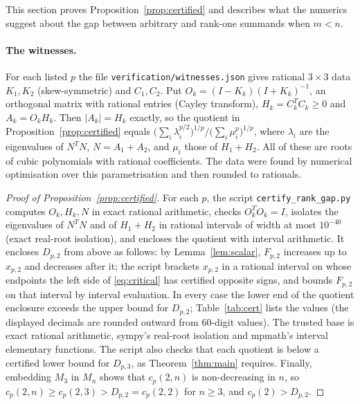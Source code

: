 \documentclass[11pt,a4paper]{article}
\numberwithin{equation}{section}
\theoremstyle{definition}
\theoremstyle{remark}
\begin{document}
This section proves Proposition~\ref{prop:certified} and describes what
the numerics suggest about the gap between arbitrary and rank-one
summands when \(m<n\).

\paragraph{The witnesses.}
For each listed \(p\) the file \texttt{verification/witnesses.json} gives
rational \(3\times3\) data \(K_1,K_2\) (skew-symmetric) and \(C_1,C_2\).
Put \(O_k=(I-K_k)(I+K_k)^{-1}\), an orthogonal matrix with rational entries
(Cayley transform), \(H_k=C_k^TC_k\ge0\) and \(A_k=O_kH_k\). Then
\(|A_k|=H_k\) exactly, so the quotient in Proposition~\ref{prop:certified}
equals \(\bigl(\sum_i\lambda_i^{p/2}\bigr)^{1/p}/
\bigl(\sum_i\mu_i^p\bigr)^{1/p}\), where \(\lambda_i\) are the eigenvalues
of \(N^TN\), \(N=A_1+A_2\), and \(\mu_i\) those of \(H_1+H_2\). All of
these are roots of cubic polynomials with rational coefficients. The data
were found by numerical optimisation over this parametrisation and then
rounded to rationals.

\begin{proof}[Proof of Proposition~\ref{prop:certified}]
For each \(p\), the script \texttt{certify\_rank\_gap.py} computes
\(O_k,H_k,N\) in exact rational arithmetic, checks \(O_k^TO_k=I\),
isolates the eigenvalues of \(N^TN\) and of \(H_1+H_2\) in rational
intervals of width at most \(10^{-40}\) (exact real-root isolation), and
encloses the quotient with interval arithmetic. It encloses \(D_{p,2}\)
from above as follows: by Lemma~\ref{lem:scalar}, \(F_{p,2}\) increases up
to \(x_{p,2}\) and decreases after it; the script brackets \(x_{p,2}\) in a
rational interval on whose endpoints the left side of \eqref{eq:critical}
has certified opposite signs, and bounds \(F_{p,2}\) on that interval by
interval evaluation. In every case the lower end of the quotient
enclosure exceeds the upper bound for \(D_{p,2}\); Table~\ref{tab:cert}
lists the values (the displayed decimals are rounded outward from
60-digit values). The trusted base is exact rational arithmetic, sympy's
real-root isolation and mpmath's interval elementary functions. The script also checks that each quotient is below a
certified lower bound for \(D_{p,3}\), as Theorem~\ref{thm:main} requires.
Finally, embedding \(M_3\) in \(M_n\) shows that \(c_p(2,n)\) is
non-decreasing in \(n\), so \(c_p(2,n)\ge c_p(2,3)>D_{p,2}=c_p(2,2)\) for
\(n\ge3\), and \(c_p(2)>D_{p,2}\).
\end{proof}
\end{document}
